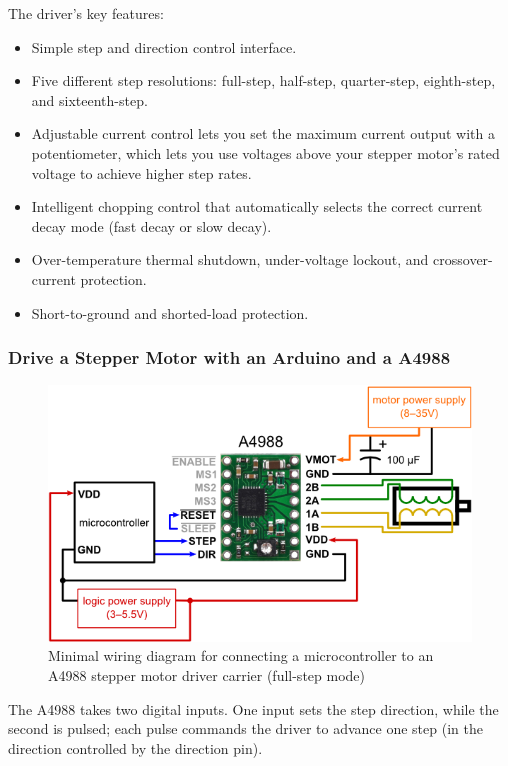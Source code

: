 The driver's key features:
\begin{itemize}
\item Simple step and direction control interface.
\item Five different step resolutions: full-step, half-step, quarter-step, eighth-step, and sixteenth-step.
\item Adjustable current control lets you set the maximum current output with a potentiometer, which lets you use voltages above your stepper motor's rated voltage to achieve higher step rates.
\item Intelligent chopping control that automatically selects the correct current decay mode (fast decay or slow decay).
\item Over-temperature thermal shutdown, under-voltage lockout, and crossover-current protection.
\item Short-to-ground and shorted-load protection.
\end{itemize}

\subsubsection{Drive a Stepper Motor with an Arduino and a A4988}
\begin{figure}[H]
	\centering
	\includegraphics[width=\maxwidth{10cm}, keepaspectratio]{Chapters/Fig/minimal_wiring_diagram_pololu_A4988.png}
	\caption{Minimal wiring diagram for connecting a microcontroller to an A4988 stepper motor driver carrier (full-step mode)}
	\label{fig:minimal_wiring_diagram_pololu_A4988}
\end{figure}
The A4988 takes two digital inputs. One input sets the step direction, while the second is pulsed; each pulse commands the driver to advance one step (in the direction controlled by the direction pin). 


